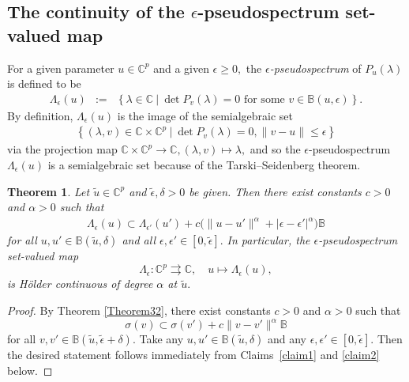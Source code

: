 \documentclass[10pt,reqno]{amsart}
\theoremstyle{break-italic}
\theoremstyle{break-italic}
\theoremstyle{break-italic}
\theoremstyle{break-italic}
\theoremstyle{break-italic}
\theoremstyle{break-italic}
\theoremstyle{break-italic}
\theoremstyle{break-italic}
\newtheorem{theorem}[satz]{Theorem}
\theoremstyle{break-roman}
\theoremstyle{standard}
\theoremstyle{varthm-roman}
\theoremstyle{varthm-italic}
\theoremstyle{varthm-roman-break}
\theoremstyle{varthm-italic-break}
\theoremstyle{varthm-roman-no-punctuation}
\theoremstyle{varthm-italic-no-punctuation}
\numberwithin{equation}{section}
\begin{document}
\subsection{The continuity of the $\epsilon$-pseudospectrum set-valued map}

For a given parameter $u \in \mathbb{C}^p$ and a given $\epsilon \ge 0,$ the {\em $\epsilon$-pseudospectrum} of $P_{u}(\lambda)$ is defined to be
\begin{eqnarray*}
\Lambda_\epsilon(u) &:=& \left\{ \lambda \in \mathbb{C} \ | \ \det P_{v}(\lambda) = 0 \mbox{ for some } v \in \mathbb{B}(u, \epsilon) \right\}.
\end{eqnarray*}
By definition, $\Lambda_\epsilon(u)$ is the image of the semialgebraic set
\begin{eqnarray*}
\left\{ (\lambda, v) \in \mathbb{C} \times \mathbb{C}^p  \ | \ \det P_{v}(\lambda) = 0, \|v - u\| \le \epsilon \right\}
\end{eqnarray*}
via the projection map $\mathbb{C} \times \mathbb{C}^p \rightarrow \mathbb{C}, (\lambda, v) \mapsto \lambda,$ and so the $\epsilon$-pseudospectrum
$\Lambda_\epsilon(u)$ is a semialgebraic set because of the Tarski--Seidenberg theorem.

\begin{theorem}\label{thr:epsilon-pseudospectrum}
Let $\tilde{u} \in \mathbb{C}^p$ and $\tilde{\epsilon}, \delta > 0$ be given. Then there exist constants $c > 0$ and $\alpha > 0$ such that
\begin{eqnarray*}
\Lambda_{\epsilon}(u)  \subset \Lambda_{\epsilon'}(u') + c \big(\|u-u'\|^\alpha + |\epsilon - \epsilon'|^\alpha\big)\mathbb{B}
\end{eqnarray*}
for all $u, u' \in \mathbb B(\tilde{u},\delta)$ and all $\epsilon, \epsilon' \in [0, \tilde{\epsilon}].$
In particular, the $\epsilon$-pseudospectrum set-valued map
$$\Lambda_{\epsilon} \colon \mathbb{C}^p \rightrightarrows \mathbb{C}, \quad u \mapsto \Lambda_{\epsilon}(u),$$
is H\"older continuous of degree $\alpha$ at $\tilde{u}.$
\end{theorem}

\begin{proof}
By Theorem \ref{Theorem32}, there exist constants $c > 0$ and $\alpha  > 0$ such that
\begin{equation} \label{equ-pseudo}
 \sigma(v) \subset  \sigma({v'}) + c \|v-{v'}\|^\alpha \mathbb{B}
 \end{equation}
for all $  v, {v'} \in \mathbb B(\tilde{u}, \tilde{\epsilon} + \delta).$ Take any $u, u' \in \mathbb B(\tilde{u},\delta)$ and any $\epsilon, \epsilon' \in [0, \tilde{\epsilon}].$ Then the desired statement follows immediately from Claims~\ref{claim1} and \ref{claim2} below.
\end{proof}
\end{document}
